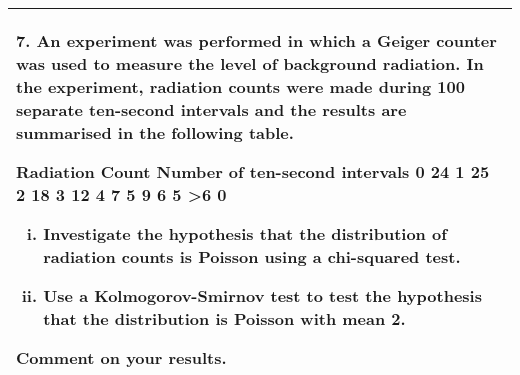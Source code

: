 \documentclass[a4paper,12pt]{article}
\begin{document}
\begin{table}[ht!]
     

\centering
     

\begin{tabular}{|p{15cm}|}
     

\hline 
\large
 
7. An experiment was performed in which a Geiger counter was used to measure the level of background radiation.  In the experiment, radiation counts were made during 100 separate ten-second intervals and the results are summarised in the following table. 
 
Radiation Count Number of ten-second intervals 0 24 1 25 2 18 3 12 4 7 5 9 6 5 >6 0 
 
\begin{enumerate}[(i)] 
\item Investigate the hypothesis that the distribution of radiation counts is Poisson using a chi-squared test.  
\item  Use a Kolmogorov-Smirnov test to test the hypothesis that the distribution is Poisson with mean 2.  
\end{enumerate}
Comment on your results. 

\\ \hline


\end{tabular}
    

\end{table}
\end{document}
